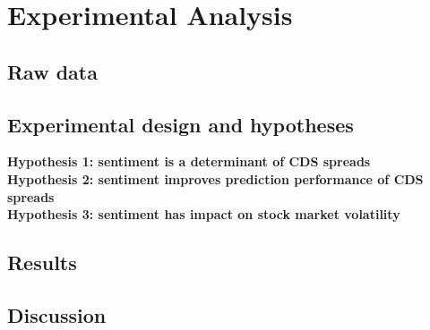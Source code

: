 \chapter{Experimental Analysis}\label{sec5}
\thispagestyle{empty}

\section{Raw data}

\section{Experimental design and hypotheses}

\textbf{Hypothesis 1: sentiment is a determinant of CDS spreads}
\cite{annaert2013} \\

\noindent
\textbf{Hypothesis 2: sentiment improves prediction performance of CDS spreads}
\cite{gunduz2011} \\

\noindent
\textbf{Hypothesis 3: sentiment has impact on stock market volatility}
\cite{audrino2020}

\textbf{}

\section{Results}

\section{Discussion}





\cleardoublepage
